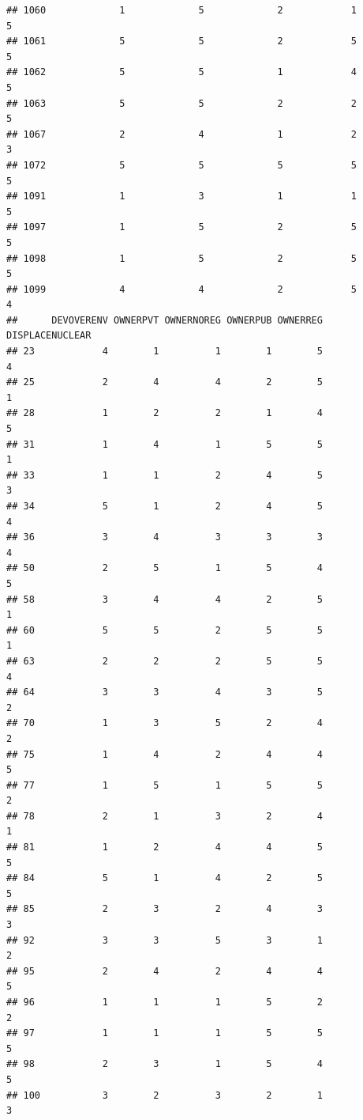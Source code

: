 \documentclass[
]{article}
\begin{document}
\begin{verbatim}
## 1060             1             5             2            1          5
## 1061             5             5             2            5          5
## 1062             5             5             1            4          5
## 1063             5             5             2            2          5
## 1067             2             4             1            2          3
## 1072             5             5             5            5          5
## 1091             1             3             1            1          5
## 1097             1             5             2            5          5
## 1098             1             5             2            5          5
## 1099             4             4             2            5          4
##      DEVOVERENV OWNERPVT OWNERNOREG OWNERPUB OWNERREG DISPLACENUCLEAR
## 23            4        1          1        1        5               4
## 25            2        4          4        2        5               1
## 28            1        2          2        1        4               5
## 31            1        4          1        5        5               1
## 33            1        1          2        4        5               3
## 34            5        1          2        4        5               4
## 36            3        4          3        3        3               4
## 50            2        5          1        5        4               5
## 58            3        4          4        2        5               1
## 60            5        5          2        5        5               1
## 63            2        2          2        5        5               4
## 64            3        3          4        3        5               2
## 70            1        3          5        2        4               2
## 75            1        4          2        4        4               5
## 77            1        5          1        5        5               2
## 78            2        1          3        2        4               1
## 81            1        2          4        4        5               5
## 84            5        1          4        2        5               5
## 85            2        3          2        4        3               3
## 92            3        3          5        3        1               2
## 95            2        4          2        4        4               5
## 96            1        1          1        5        2               2
## 97            1        1          1        5        5               5
## 98            2        3          1        5        4               5
## 100           3        2          3        2        1               3

\end{verbatim}
\end{document}
